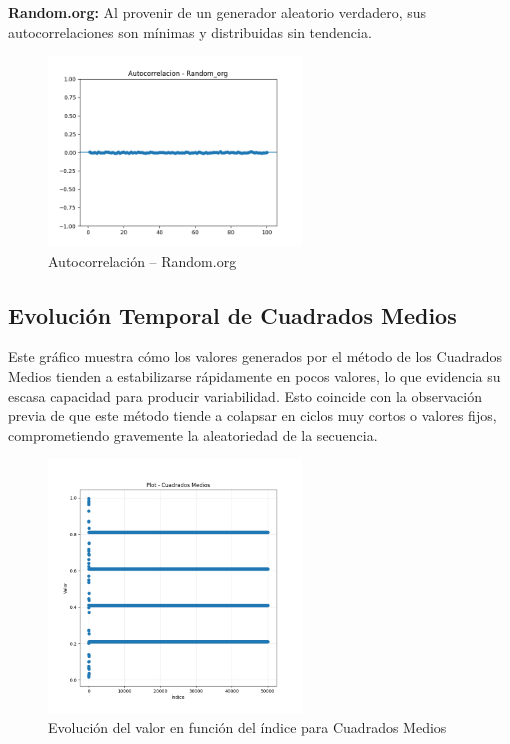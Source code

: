 \documentclass{article}
\begin{document}
\textbf{Random.org:} Al provenir de un generador aleatorio verdadero, sus autocorrelaciones son mínimas y distribuidas sin tendencia.

\begin{figure}[H]
\centering
\includegraphics[width=0.6\textwidth]{Imagenes/autocorrelacion_Random_org.png}
\caption{Autocorrelación – Random.org}
\end{figure}

\subsection{Evolución Temporal de Cuadrados Medios}

Este gráfico muestra cómo los valores generados por el método de los Cuadrados Medios tienden a estabilizarse rápidamente en pocos valores, lo que evidencia su escasa capacidad para producir variabilidad. Esto coincide con la observación previa de que este método tiende a colapsar en ciclos muy cortos o valores fijos, comprometiendo gravemente la aleatoriedad de la secuencia.

\begin{figure}[H]
\centering
\includegraphics[width=0.6\textwidth]{Imagenes/plot_Cuadrados Medios.png}
\caption{Evolución del valor en función del índice para Cuadrados Medios}
\end{figure}
\end{document}
